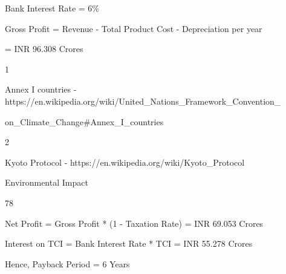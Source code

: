 \documentclass[a4paper,portrait,12pt]{article}
\begin{document}
\begin{flushleft}
Bank Interest Rate = 6\%
\end{flushleft}


\begin{flushleft}
Gross Profit = Revenue - Total Product Cost - Depreciation per year
\end{flushleft}


\begin{flushleft}
= INR 96.308 Crores
\end{flushleft}


1





\begin{flushleft}
Annex I countries - https://en.wikipedia.org/wiki/United\_Nations\_Framework\_Convention\_
\end{flushleft}


\begin{flushleft}
on\_Climate\_Change\#Annex\_I\_countries
\end{flushleft}


2


\begin{flushleft}
Kyoto Protocol - https://en.wikipedia.org/wiki/Kyoto\_Protocol
\end{flushleft}





\begin{flushleft}
\newpage
Environmental Impact
\end{flushleft}





78





\begin{flushleft}
Net Profit = Gross Profit * (1 - Taxation Rate) = INR 69.053 Crores
\end{flushleft}


\begin{flushleft}
Interest on TCI = Bank Interest Rate * TCI = INR 55.278 Crores
\end{flushleft}


\begin{flushleft}
Hence, Payback Period = 6 Years
\end{flushleft}
\end{document}
